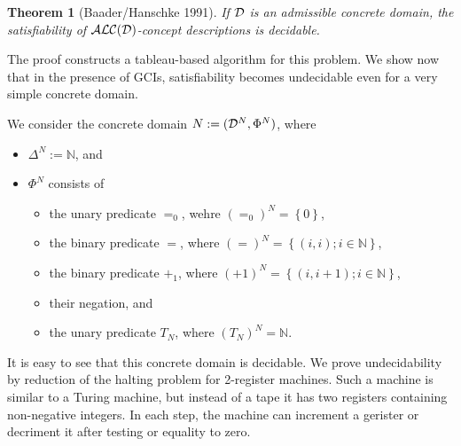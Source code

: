 \documentclass[openany]{scrbook}
\theoremstyle{break}
\newtheorem{Theorem}{Theorem}[chapter]
\theoremstyle{nonumberbreak}
\theoremstyle{nonumberplain}
\theoremstyle{nonumberbreak}
\newcommand{\N}{\mathbb{N}}
\newcommand{\set}[1]{\left\{#1\right\}}
\newcommand{\ALC}{{\cal A}{\cal L}{\cal C}}
\begin{document}
\begin{Theorem}[Baader/Hanschke 1991]
  \label{7.9}
  If ${\cal D}$ is an admissible concrete domain, the satisfiability
  of $\ALC({\cal D})$-concept descriptions is decidable.
\end{Theorem}

The proof constructs a tableau-based algorithm for this problem. We
show now that in the presence of GCIs, satisfiability becomes
undecidable even for a very simple concrete domain.

We consider the concrete domain $N := ({\cal D}^N, \Phi^N)$, where
\begin{itemize}
\item $\Delta^N := \N$, and
\item $\Phi^N$ consists of
  \begin{itemize}
  \item the unary predicate $=_0$, wehre $(=_0)^N = \set{0}$,
  \item the binary predicate $=$, where $(=)^N = \set{(i, i); i \in \N}$,
  \item the binary predicate $+_1$, where $(+1)^N = \set{(i, i + 1); i
      \in \N}$,
  \item their negation, and
  \item the unary predicate $T_N$, where $(T_N)^N = \N$.
  \end{itemize}
\end{itemize}

It is easy to see that this concrete domain is decidable. We prove
undecidability by reduction of the halting problem for 2-register
machines. Such a machine is similar to a Turing machine, but instead
of a tape it has two registers containing non-negative integers. In
each step, the machine can increment a gerister or decriment it after
testing or equality to zero.
\end{document}
